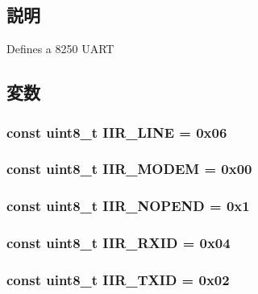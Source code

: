 \subsection{説明}
Defines a 8250 UART 

\subsection{変数}
\hypertarget{uart8250_8hh_af1079c5ddaaa9e5dad93a1f960249753}{
\subsubsection[{IIR\_\-LINE}]{\setlength{\rightskip}{0pt plus 5cm}const uint8\_\-t {\bf IIR\_\-LINE} = 0x06}}
\label{uart8250_8hh_af1079c5ddaaa9e5dad93a1f960249753}
\hypertarget{uart8250_8hh_a5ac2543298850967bebfd13900fd395a}{
\subsubsection[{IIR\_\-MODEM}]{\setlength{\rightskip}{0pt plus 5cm}const uint8\_\-t {\bf IIR\_\-MODEM} = 0x00}}
\label{uart8250_8hh_a5ac2543298850967bebfd13900fd395a}
\hypertarget{uart8250_8hh_ab3553fd154cb50413c7d325db0fee164}{
\subsubsection[{IIR\_\-NOPEND}]{\setlength{\rightskip}{0pt plus 5cm}const uint8\_\-t {\bf IIR\_\-NOPEND} = 0x1}}
\label{uart8250_8hh_ab3553fd154cb50413c7d325db0fee164}
\hypertarget{uart8250_8hh_aa23d867007b3fe8b72a15b8916cd1339}{
\subsubsection[{IIR\_\-RXID}]{\setlength{\rightskip}{0pt plus 5cm}const uint8\_\-t {\bf IIR\_\-RXID} = 0x04}}
\label{uart8250_8hh_aa23d867007b3fe8b72a15b8916cd1339}
\hypertarget{uart8250_8hh_a83979ec692cb69b514a3223139ba6190}{
\subsubsection[{IIR\_\-TXID}]{\setlength{\rightskip}{0pt plus 5cm}const uint8\_\-t {\bf IIR\_\-TXID} = 0x02}}
